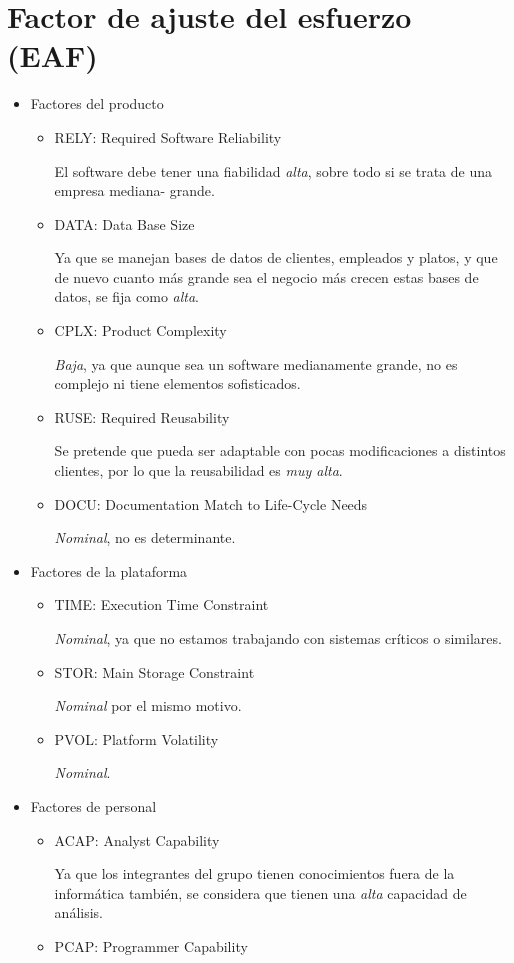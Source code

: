 \documentclass[spanish,a4paper,11pt, twoside]{report}	%
\begin{document}
\section{Factor de ajuste del esfuerzo (EAF)}
\begin {itemize}
	\item{Factores del producto}
		\begin{itemize}
			\item{RELY: Required Software Reliability}

			El software debe tener una fiabilidad \textit{alta}, sobre todo si se trata de una empresa mediana- grande.
			\item{DATA: Data Base Size}

			Ya que se manejan bases de datos de clientes, empleados y platos, y que de nuevo cuanto más grande sea el negocio más crecen estas bases de datos, se fija como \textit{alta}.
			\item{CPLX: Product Complexity}

			\textit{Baja}, ya que aunque sea un software medianamente grande, no es complejo ni tiene elementos sofisticados.
			\item{RUSE: Required Reusability}

			Se pretende que pueda ser adaptable con pocas modificaciones a distintos clientes, por lo que la reusabilidad es \textit{muy alta}.
			\item{DOCU: Documentation Match to Life-Cycle Needs}

			\textit{Nominal}, no es determinante.
		\end{itemize}
	\item{Factores de la plataforma}
		\begin{itemize}
			\item{TIME: Execution Time Constraint}

			\textit{Nominal}, ya que no estamos trabajando con sistemas críticos o similares.
			\item{STOR: Main Storage Constraint}

			\textit{Nominal} por el mismo motivo.
			\item{PVOL: Platform Volatility}

			\textit{Nominal}.
		\end{itemize}
	\item{Factores de personal}
		\begin{itemize}
			\item{ACAP: Analyst Capability}

			Ya que los integrantes del grupo tienen conocimientos fuera de la informática también, se considera que tienen una \textit{alta} capacidad de análisis.
			\item{PCAP: Programmer Capability}
	

\end{itemize}
\end{itemize}
\end{document}
